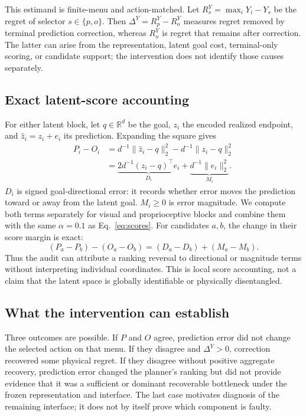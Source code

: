 \documentclass[letterpaper,10pt,conference]{ieeeconf}
\begin{document}
This estimand is finite-menu and action-matched. Let
$R_s^Y=\max_iY_i-Y_s$ be the regret of selector $s\in\{p,o\}$. Then
$\Delta^Y=R_p^Y-R_o^Y$ measures regret removed by terminal prediction
correction, whereas $R_o^Y$ is regret that remains after correction. The latter
can arise from the representation, latent goal cost, terminal-only scoring, or
candidate support; the intervention does not identify those causes separately.

\subsection{Exact latent-score accounting}

For either latent block, let $q\in\mathbb{R}^d$ be the goal, $z_i$ the encoded
realized endpoint, and $\hat z_i=z_i+e_i$ its prediction. Expanding the square
gives
\begin{equation}
\begin{split}
P_i-O_i
&=d^{-1}\|\hat z_i-q\|_2^2-d^{-1}\|z_i-q\|_2^2\\
&=\underbrace{2d^{-1}(z_i-q)^\top e_i}_{D_i}
+\underbrace{d^{-1}\|e_i\|_2^2}_{M_i}.
\end{split}
\label{eq:decomp}
\end{equation}
$D_i$ is signed goal-directional error: it records whether error moves the
prediction toward or away from the latent goal. $M_i\geq0$ is error magnitude.
We compute both terms separately for visual and proprioceptive blocks and
combine them with the same $\alpha=0.1$ as Eq.~\ref{eq:scores}.
For candidates $a,b$, the change in their score margin is exact:
\begin{equation}
(P_a-P_b)-(O_a-O_b)=(D_a-D_b)+(M_a-M_b).
\label{eq:pair}
\end{equation}
Thus the audit can attribute a ranking reversal to directional or magnitude
terms without interpreting individual coordinates. This is local score
accounting, not a claim that the latent space is globally identifiable or
physically disentangled.

\subsection{What the intervention can establish}

Three outcomes are possible. If $P$ and $O$ agree, prediction error did not
change the selected action on that menu. If they disagree and $\Delta^Y>0$,
correction recovered some physical regret. If they disagree without positive
aggregate recovery, prediction error changed the planner's ranking but did not
provide evidence that it was a sufficient or dominant recoverable bottleneck
under the frozen representation and interface. The last case motivates
diagnosis of the remaining interface; it does not by itself prove which
component is faulty.
\end{document}
